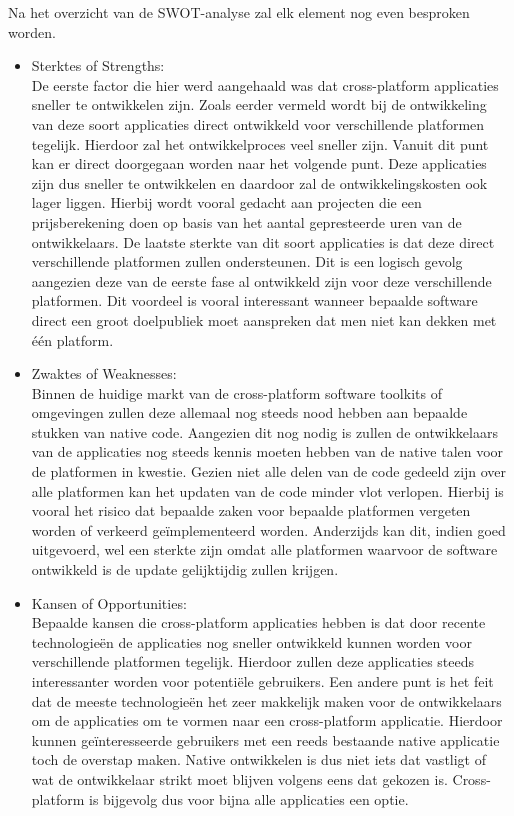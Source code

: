 Na het overzicht van de SWOT-analyse zal elk element nog even besproken worden. 
\begin{itemize}
    \item Sterktes of Strengths:\\
    De eerste factor die hier werd aangehaald was dat cross-platform applicaties sneller te ontwikkelen zijn. Zoals eerder vermeld wordt bij de ontwikkeling van deze soort applicaties direct ontwikkeld voor verschillende platformen tegelijk. Hierdoor zal het ontwikkelproces veel sneller zijn. Vanuit dit punt kan er direct doorgegaan worden naar het volgende punt. Deze applicaties zijn dus sneller te ontwikkelen en daardoor zal de ontwikkelingskosten ook lager liggen. Hierbij wordt vooral gedacht aan projecten die een prijsberekening doen op basis van het aantal gepresteerde uren van de ontwikkelaars. De laatste sterkte van dit soort applicaties is dat deze direct verschillende platformen zullen ondersteunen. Dit is een logisch gevolg aangezien deze van de eerste fase al ontwikkeld zijn voor deze verschillende platformen. Dit voordeel is vooral interessant wanneer bepaalde software direct een groot doelpubliek moet aanspreken dat men niet kan dekken met één platform.
    \\
    
    \item Zwaktes of Weaknesses:\\
    Binnen de huidige markt van de cross-platform software toolkits of omgevingen zullen deze allemaal nog steeds nood hebben aan bepaalde stukken van native code. Aangezien dit nog nodig is zullen de ontwikkelaars van de applicaties nog steeds kennis moeten hebben van de native talen voor de platformen in kwestie. Gezien niet alle delen van de code gedeeld zijn over alle platformen kan het updaten van de code minder vlot verlopen. Hierbij is vooral het risico dat bepaalde zaken voor bepaalde platformen vergeten worden of verkeerd geïmplementeerd worden. Anderzijds kan dit, indien goed uitgevoerd, wel een sterkte zijn omdat alle platformen waarvoor de software ontwikkeld is de update gelijktijdig zullen krijgen.
    \\
    
    \item Kansen of Opportunities:\\
    Bepaalde kansen die cross-platform applicaties hebben is dat door recente technologieën de applicaties nog sneller ontwikkeld kunnen worden voor verschillende platformen tegelijk. Hierdoor zullen deze applicaties steeds interessanter worden voor potentiële gebruikers. Een andere punt is het feit dat de meeste technologieën het zeer makkelijk maken voor de ontwikkelaars om de applicaties om te vormen naar een cross-platform applicatie. Hierdoor kunnen geïnteresseerde gebruikers met een reeds bestaande native applicatie toch de overstap maken. Native ontwikkelen is dus niet iets dat vastligt of wat de ontwikkelaar strikt moet blijven volgens eens dat gekozen is. Cross-platform is bijgevolg dus voor bijna alle applicaties een optie. 
    \\
    

\end{itemize}
